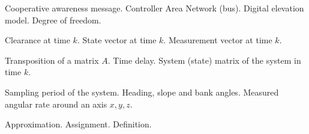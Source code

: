 		{Cooperative awareness message.}
		{Controller Area Network (bus).}
		{Digital elevation model.}
		{Degree of freedom.}

						{Clearance at time $k$.}
						{State vector at time $k$.}
						{Measurement vector at time $k$.}

					{Transposition of a matrix $A$.}
							{Time delay.}
							{System (state) matrix of the system in time $k$.}

						{Sampling period of the system.}
\nomenclature[G]{$\psi, \theta, \phi$}				{Heading, slope and bank angles.}
		{Measured angular rate around an axis $x,y,z$.}

\nomenclature[O]{$\approx$}							{Approximation.}
\nomenclature[O]{$\coloneqq$}						{Assignment.}
\nomenclature[O]{$\triangleq$}						{Definition.}
